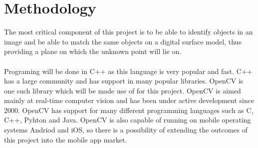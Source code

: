 

\section{Methodology}

The most critical component of this project is to be able to identify objects in an image and be able to match 
the same objects on a digital surface model, thus providing a plane on which the unknown point will lie on.


\paragraph{}
Programing will be done in C++ as this language is very popular and fast. C++ has a large community and has support 
in many popular libraries. OpenCV is one such library which will be made use of for this project.
OpenCV is aimed mainly at real-time computer vision and has been under active development since 2000. 
OpenCV has support for many different programming languages such as C, C++, Pyhton and Java. 
OpenCV is also capable of running on mobile operating systems Andriod and iOS, so there is a possibility
 of extending the outcomes of this project into the mobile app market.
